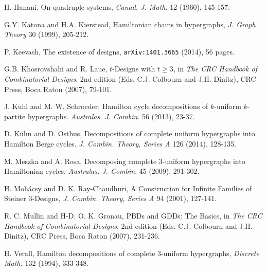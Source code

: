 \begin{thebibliography}{99}




  H. Hanani,
  On quadruple systems,
  {\em Canad. J. Math.} 12 (1960), 145-157.

  G.Y. Katona and H.A. Kierstead,
  Hamiltonian chains in hypergraphs,
  {\em J. Graph Theory} 30 (1999), 205-212.

  P. Keevash,
  The existence of designs,
  {\tt arXiv:1401.3665} (2014), 56 pages.

  G.B. Khosrovshahi and R. Laue,
  $t$-Designs with $t \geq 3$,
  in {\em The CRC Handbook of Combinatorial Designs}, 2nd edition
  (Eds. C.J. Colbourn and J.H. Dinitz),
  CRC Press, Boca Raton (2007), 79-101.

  J. Kuhl and M. W. Schroeder,
  Hamilton cycle decompositions of $k$-uniform $k$-partite hypergraphs.
  {\em Australas. J. Combin}. 56 (2013), 23-37.

  D. K\"{u}hn and D. Osthus,
  Decompositions of complete uniform hypergraphs into Hamilton Berge cycles.
  {\em J. Combin. Theory, Series A} 126 (2014), 128-135.

  M. Meszka and A. Rosa,
  Decomposing complete 3-uniform hypergraphs into Hamiltonian cycles.
  {\em Australas. J. Combin}. 45 (2009), 291-302.

  H. Moh\'{a}csy and D. K. Ray-Chaudhuri,
  A Construction for Infinite Families of Steiner 3-Designs,
  {\em J. Combin. Theory, Series A} 94 (2001), 127-141.

  R. C. Mullin and H-D. O. K. Gronau,
  PBDs and GDDs: The Basics,
  in {\em The CRC Handbook of Combinatorial Designs}, 2nd edition
  (Eds. C.J. Colbourn and J.H. Dinitz),
  CRC Press, Boca Raton (2007), 231-236.

  H. Verall,
  Hamilton decompositions of complete 3-uniform hypergraphs,
  {\em Discrete Math.} 132 (1994), 333-348.

\end{thebibliography}
